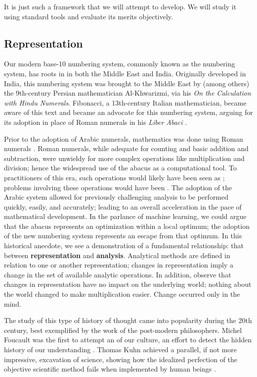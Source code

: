 \documentclass[12pt]{book}
\begin{document}
It is just such a framework that we will attempt to develop.
We will study it using standard tools and evaluate its merits objectively.


\subsection{Representation}

Our modern base-10 numbering system, commonly known as the  numbering system, has roots in in both the Middle East and India.
Originally developed in India, this numbering system was brought to the Middle East by (among others) the 9th-century Persian mathematician Al-Khwarizmi, via his \textit{On the Calculation with Hindu Numerals}.
Fibonacci, a 13th-century Italian mathematician, became aware of this text and became an advocate for this numbering system, arguing for its adoption in place of Roman numerals in his \textit{Liber Abaci} \cite{ore} \cite{ferguson}.

Prior to the adoption of Arabic numerals, mathematics was done using Roman numerals \cite{heilbroner} \cite{gowers}.
Roman numerals, while adequate for counting and basic addition and subtraction, were unwieldy for more complex operations like multiplication and division; hence the widespread use of the abacus as a computational tool.
To practitioners of this era, such operations would likely have been seen as ; problems involving these operations would have been .
The adoption of the Arabic system allowed for previously challenging analysis to be performed quickly, easily, and accurately; leading to an overall acceleration in the pace of mathematical development.
In the parlance of machine learning, we could argue that the abacus represents an optimization within a local optimum; the adoption of the new numbering system represents an escape from that optimum.
In this historical anecdote, we see a demonstration of a fundamental relationship: that between \textbf{representation} and \textbf{analysis}.
Analytical methods are defined in relation to one or another representation; changes in representation imply a change in the set of available analytic operations.
In addition, observe that changes in representation have no impact on the underlying world; nothing about the world changed to make multiplication easier.
Change occurred only in the mind.

The study of this type of history of thought came into popularity during the 20th century, best exemplified by the work of the post-modern philosophers.
Michel Foucault was the first to attempt an  of our culture, an effort to detect the hidden history of our understanding \cite{foucault}.
Thomas Kuhn achieved a parallel, if not more impressive, excavation of science, showing how the idealized perfection of the objective scientific method fails when implemented by human beings \cite{kuhn}.
\end{document}
